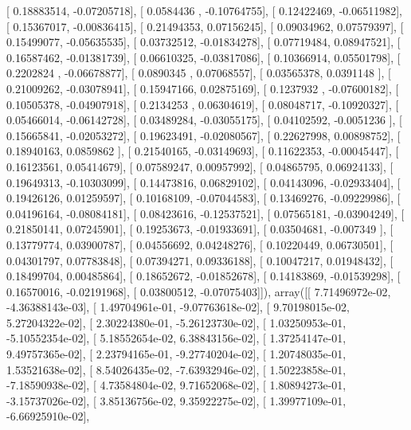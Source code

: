 \documentclass{article}
\begin{document}
       [ 0.18883514, -0.07205718],
       [ 0.0584436 , -0.10764755],
       [ 0.12422469, -0.06511982],
       [ 0.15367017, -0.00836415],
       [ 0.21494353,  0.07156245],
       [ 0.09034962,  0.07579397],
       [ 0.15499077, -0.05635535],
       [ 0.03732512, -0.01834278],
       [ 0.07719484,  0.08947521],
       [ 0.16587462, -0.01381739],
       [ 0.06610325, -0.03817086],
       [ 0.10366914,  0.05501798],
       [ 0.2202824 , -0.06678877],
       [ 0.0890345 ,  0.07068557],
       [ 0.03565378,  0.0391148 ],
       [ 0.21009262, -0.03078941],
       [ 0.15947166,  0.02875169],
       [ 0.1237932 , -0.07600182],
       [ 0.10505378, -0.04907918],
       [ 0.2134253 ,  0.06304619],
       [ 0.08048717, -0.10920327],
       [ 0.05466014, -0.06142728],
       [ 0.03489284, -0.03055175],
       [ 0.04102592, -0.0051236 ],
       [ 0.15665841, -0.02053272],
       [ 0.19623491, -0.02080567],
       [ 0.22627998,  0.00898752],
       [ 0.18940163,  0.0859862 ],
       [ 0.21540165, -0.03149693],
       [ 0.11622353, -0.00045447],
       [ 0.16123561,  0.05414679],
       [ 0.07589247,  0.00957992],
       [ 0.04865795,  0.06924133],
       [ 0.19649313, -0.10303099],
       [ 0.14473816,  0.06829102],
       [ 0.04143096, -0.02933404],
       [ 0.19426126,  0.01259597],
       [ 0.10168109, -0.07044583],
       [ 0.13469276, -0.09229986],
       [ 0.04196164, -0.08084181],
       [ 0.08423616, -0.12537521],
       [ 0.07565181, -0.03904249],
       [ 0.21850141,  0.07245901],
       [ 0.19253673, -0.01933691],
       [ 0.03504681, -0.007349  ],
       [ 0.13779774,  0.03900787],
       [ 0.04556692,  0.04248276],
       [ 0.10220449,  0.06730501],
       [ 0.04301797,  0.07783848],
       [ 0.07394271,  0.09336188],
       [ 0.10047217,  0.01948432],
       [ 0.18499704,  0.00485864],
       [ 0.18652672, -0.01852678],
       [ 0.14183869, -0.01539298],
       [ 0.16570016, -0.02191968],
       [ 0.03800512, -0.07075403]]), array([[  7.71496972e-02,  -4.36388143e-03],
       [  1.49704961e-01,  -9.07763618e-02],
       [  9.70198015e-02,   5.27204322e-02],
       [  2.30224380e-01,  -5.26123730e-02],
       [  1.03250953e-01,  -5.10552354e-02],
       [  5.18552654e-02,   6.38843156e-02],
       [  1.37254147e-01,   9.49757365e-02],
       [  2.23794165e-01,  -9.27740204e-02],
       [  1.20748035e-01,   1.53521638e-02],
       [  8.54026435e-02,  -7.63932946e-02],
       [  1.50223858e-01,  -7.18590938e-02],
       [  4.73584804e-02,   9.71652068e-02],
       [  1.80894273e-01,  -3.15737026e-02],
       [  3.85136756e-02,   9.35922275e-02],
       [  1.39977109e-01,  -6.66925910e-02],
\end{document}
